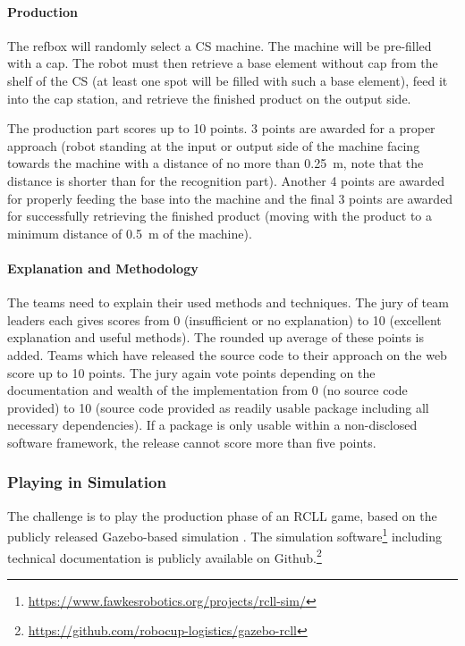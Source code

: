 \documentclass[12pt,twoside]{article}
\begin{document}
\vspace{-2ex}\paragraph{Production}
The refbox will randomly select a CS machine. The machine will be
pre-filled with a cap. The robot must then retrieve a base element
without cap from the shelf of the CS (at least one spot will be filled
with such a base element), feed it into the cap station, and retrieve
the finished product on the output side.

The production part scores up to 10 points. 3 points are awarded for a
proper approach (robot standing at the input or output side of the
machine facing towards the machine with a distance of no more than
\SI{0.25}{\metre}, note that the distance is shorter than for the
recognition part). Another 4 points are awarded for properly feeding
the base into the machine and the final 3 points are awarded for
successfully retrieving the finished product (moving with the product
to a minimum distance of \SI{0.5}{\metre} of the machine).

\vspace{-2ex}\paragraph{Explanation and Methodology}
%
The teams need to explain their used methods and techniques. The jury
of team leaders each gives scores from 0 (insufficient or no
explanation) to 10 (excellent explanation and useful methods). The
rounded up average of these points is added. Teams which have released
the source code to their approach on the web score up to 10
points. The jury again vote points depending on the documentation and
wealth of the implementation from 0 (no source code provided) to 10
(source code provided as readily usable package including all
necessary dependencies). If a package is only usable within a
non-disclosed software framework, the release cannot score more than
five points.


\subsubsection{Playing in Simulation}

The challenge is to play the production phase of an RCLL game, based
on the publicly released Gazebo-based simulation
\cite{llsf-sim-rc2014-2014}. The simulation
software\footnote{\url{https://www.fawkesrobotics.org/projects/rcll-sim/}}
including technical documentation is publicly available on
Github.\footnote{\url{https://github.com/robocup-logistics/gazebo-rcll}}
\end{document}
